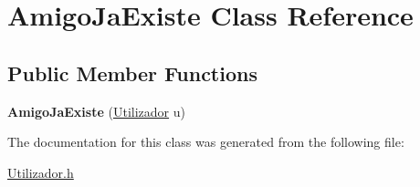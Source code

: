 \hypertarget{class_amigo_ja_existe}{}\section{Amigo\+Ja\+Existe Class Reference}
\label{class_amigo_ja_existe}
\subsection*{Public Member Functions}
\begin{DoxyCompactItemize}
\item 
\hypertarget{class_amigo_ja_existe_a9ed8e09fdd1560f9ebf3139dafe45ffe}{}{\bfseries Amigo\+Ja\+Existe} (\hyperlink{class_utilizador}{Utilizador} u)\label{class_amigo_ja_existe_a9ed8e09fdd1560f9ebf3139dafe45ffe}

\end{DoxyCompactItemize}


The documentation for this class was generated from the following file\+:\begin{DoxyCompactItemize}
\item 
\hyperlink{_utilizador_8h}{Utilizador.\+h}\end{DoxyCompactItemize}
